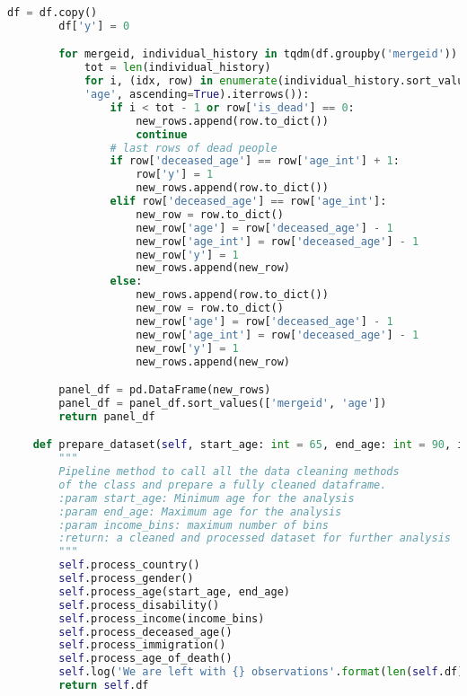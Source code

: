 \begin{lstlisting}[language=Python]
        df = df.copy()
        df['y'] = 0

        for mergeid, individual_history in tqdm(df.groupby('mergeid')):
            tot = len(individual_history)
            for i, (idx, row) in enumerate(individual_history.sort_values(
            'age', ascending=True).iterrows()):
                if i < tot - 1 or row['is_dead'] == 0:
                    new_rows.append(row.to_dict())
                    continue
                # last rows of dead people
                if row['deceased_age'] == row['age_int'] + 1:
                    row['y'] = 1
                    new_rows.append(row.to_dict())
                elif row['deceased_age'] == row['age_int']:
                    new_row = row.to_dict()
                    new_row['age'] = row['deceased_age'] - 1
                    new_row['age_int'] = row['deceased_age'] - 1
                    new_row['y'] = 1
                    new_rows.append(new_row)
                else:
                    new_rows.append(row.to_dict())
                    new_row = row.to_dict()
                    new_row['age'] = row['deceased_age'] - 1
                    new_row['age_int'] = row['deceased_age'] - 1
                    new_row['y'] = 1
                    new_rows.append(new_row)

        panel_df = pd.DataFrame(new_rows)
        panel_df = panel_df.sort_values(['mergeid', 'age'])
        return panel_df

    def prepare_dataset(self, start_age: int = 65, end_age: int = 90, income_bins: int = 10) -> pd.DataFrame:
        """
        Pipeline method to call all the data cleaning methods
        of the class and prepare a fully cleaned dataframe.
        :param start_age: Minimum age for the analysis
        :param end_age: Maximum age for the analysis
        :param income_bins: maximum number of bins
        :return: a cleaned and processed dataset for further analysis
        """
        self.process_country()
        self.process_gender()
        self.process_age(start_age, end_age)
        self.process_disability()
        self.process_income(income_bins)
        self.process_deceased_age()
        self.process_immigration()
        self.process_age_of_death()
        self.log('We are left with {} observations'.format(len(self.df)))
        return self.df

\end{lstlisting}









